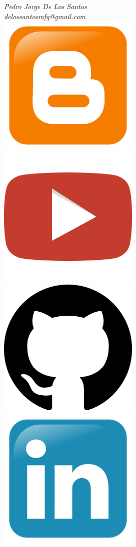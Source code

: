 \textit{Pedro Jorge De Los Santos}\\
\textit{delossantosmfq@gmail.com}\\

\href{https://labdls.blogspot.mx}{\includegraphics[scale=0.1]{src/blogger_logo.png}}
\href{https://www.youtube.com/user/lab2dls}{\includegraphics[scale=0.1]{src/youtube_logo.png}}
\href{https://github.com/JorgeDeLosSantos}{\includegraphics[scale=0.08]{src/github_logo.png}}
\href{https://www.linkedin.com/in/pjdlsl}{\includegraphics[scale=0.1]{src/linkedin_logo.png}}
